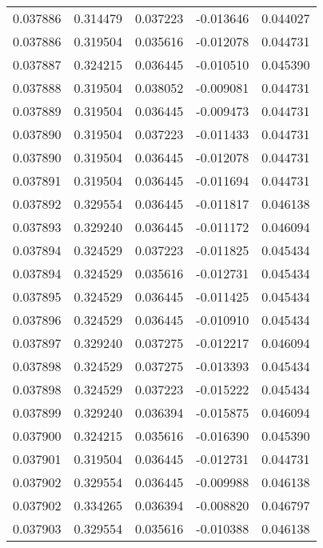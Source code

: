 \begin{tabular}{lrrrr}
0.037886    &  0.314479 &  0.037223 & -0.013646 &             0.044027 \\
0.037886    &  0.319504 &  0.035616 & -0.012078 &             0.044731 \\
0.037887    &  0.324215 &  0.036445 & -0.010510 &             0.045390 \\
0.037888    &  0.319504 &  0.038052 & -0.009081 &             0.044731 \\
0.037889    &  0.319504 &  0.036445 & -0.009473 &             0.044731 \\
0.037890    &  0.319504 &  0.037223 & -0.011433 &             0.044731 \\
0.037890    &  0.319504 &  0.036445 & -0.012078 &             0.044731 \\
0.037891    &  0.319504 &  0.036445 & -0.011694 &             0.044731 \\
0.037892    &  0.329554 &  0.036445 & -0.011817 &             0.046138 \\
0.037893    &  0.329240 &  0.036445 & -0.011172 &             0.046094 \\
0.037894    &  0.324529 &  0.037223 & -0.011825 &             0.045434 \\
0.037894    &  0.324529 &  0.035616 & -0.012731 &             0.045434 \\
0.037895    &  0.324529 &  0.036445 & -0.011425 &             0.045434 \\
0.037896    &  0.324529 &  0.036445 & -0.010910 &             0.045434 \\
0.037897    &  0.329240 &  0.037275 & -0.012217 &             0.046094 \\
0.037898    &  0.324529 &  0.037275 & -0.013393 &             0.045434 \\
0.037898    &  0.324529 &  0.037223 & -0.015222 &             0.045434 \\
0.037899    &  0.329240 &  0.036394 & -0.015875 &             0.046094 \\
0.037900    &  0.324215 &  0.035616 & -0.016390 &             0.045390 \\
0.037901    &  0.319504 &  0.036445 & -0.012731 &             0.044731 \\
0.037902    &  0.329554 &  0.036445 & -0.009988 &             0.046138 \\
0.037902    &  0.334265 &  0.036394 & -0.008820 &             0.046797 \\
0.037903    &  0.329554 &  0.035616 & -0.010388 &             0.046138 \\

\end{tabular}

